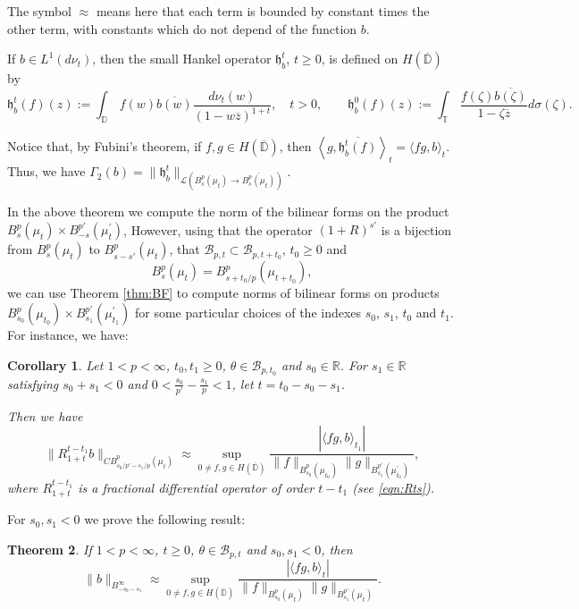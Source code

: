 \documentclass[12pt,twoside,leqno,final]{amsart}
\theoremstyle{plain}
\newtheorem{thm}{Theorem}[section]
\newtheorem{cor}[thm]{Corollary}
\begin{document}
The symbol $\approx$ means here that each term is bounded by constant times the other term, 
with constants which do  not depend of  the function $b$.

If $b\in L^1(d\nu_t)$, then the small Hankel operator $\mathfrak{h}_b^t$, $t\ge 0$,  is defined  on $ H(\overline{{\mathbb D}})$ by
$$
\mathfrak{h}_b^t(f)(z)
:=\int_{{\mathbb D}} \,f(w)\overline{b(w)} \frac{d\nu_t(w)}{(1-w\overline z)^{1+t}}, \quad t>0,
\qquad 
\mathfrak{h}^0_b(f)(z):=\int_{{\mathbb T}} \, \frac{f({\zeta})\overline{b({\zeta})}}{1-{\zeta}\overline z}d\sigma({\zeta}).
$$

Notice that, by Fubini's theorem, if $f,g\in H(\overline {{\mathbb D}})$, then 
$\left\langle g,\overline{\mathfrak{h}_b^t(f)}\right\rangle_t=\langle fg,b\rangle_t.$
Thus, we have $\Gamma_2(b)=\|\mathfrak{h}_b^t\|_{{\mathcal L}(B^p_s(\mu_t)\to \overline{B^p_s(\mu_t)})}$.

In the above theorem we compute the norm of the bilinear forms on the product $B^p_{s}(\mu_t)\times B^{p'}_{-s}(\mu^\prime_t)$, However,  
 using that the operator $(1+R)^{s'}$ is a bijection from $B^p_s(\mu_t)$ to $B^p_{s-s'}(\mu_t)$, that ${{\mathcal B}}_{p,t}\subset {{\mathcal B}}_{p,t+t_0}$, $t_0\ge 0$ and  
\begin{equation}\label{eqn:correind}
B^p_s(\mu_t)=B^p_{s+t_0/p}(\mu_{t+t_0}),
\end{equation} 
we can use Theorem \ref{thm:BF} to compute norms of bilinear 
forms on products $B^p_{s_0}(\mu_{t_0})\times B^{p'}_{s_1}(\mu^\prime_{t_1})$ for some particular choices of the indexes $s_0$, $s_1$, $t_0$ and $t_1$.
 For instance, we have:
 
\begin{cor} \label{cor:BFG}
Let $1<p<\infty$, $t_0,t_1\ge 0$, $\theta\in {{\mathcal B}}_{p,t_0}$ and $s_0\in {{\mathbb R}}$. 
For $s_1\in{{\mathbb R}}$ satisfying $ s_0+s_1<0$ and $0< \frac{s_0}{p'}-\frac{s_1}{p}<1$,  
let $t=t_0-s_0-s_1$.
 
Then we have
$$
\|R^{t-t_1}_{1+t} b\|_{CB^p_{s_0/p'-s_1/p}(\mu_t)}
\approx \sup_{0\ne f,g\in H(\overline {{\mathbb D}})}\frac{|\langle fg,b\rangle_{t_1}|}{\|f\|_{B^p_{s_0}(\mu_{t_0})}\|g\|_{B^{p'}_{s_1}(\mu^\prime_{t_0})}},
$$
where $R^{t-t_1}_{1+t}$ is a fractional differential operator of order $t-t_1$ (see \eqref{eqn:Rts}).
\end{cor}

For $s_0,s_1<0$ we prove the following result:

\begin{thm}\label{thm:predualBinfs}
If $1<p<\infty$, $t\ge 0$, $\theta\in {{\mathcal B}}_{p,t}$ and $s_0,s_1<0$, then 
$$
\| b\|_{B^\infty_{-s_0-s_1}}
\approx \sup_{0\ne f,g\in H(\overline {{\mathbb D}})}\frac{|\langle fg,b\rangle_{t}|}{\|f\|_{B^p_{s_0}(\mu_{t})}\|g\|_{B^{p'}_{s_1}(\mu_{t})}}.
$$
\end{thm}
\end{document}
